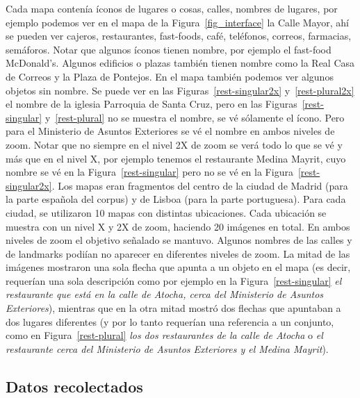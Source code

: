 Cada mapa conten\'ia \'iconos de lugares o cosas, calles, nombres de lugares, por ejemplo podemos ver en el mapa de la Figura~\ref{fig_interface} la Calle Mayor, ah\'i se pueden ver cajeros, restaurantes, fast-foods, caf\'e, tel\'efonos, correos, farmacias, sem\'aforos. Notar que algunos \'iconos tienen nombre, por ejemplo el fast-food McDonald's. Algunos edificios o plazas tambi\'en tienen nombre como la Real Casa de Correos y la Plaza de Pontejos. En el mapa tambi\'en podemos ver algunos objetos sin nombre.
Se puede ver en las Figuras~\ref{rest-singular2x} y~\ref{rest-plural2x}  el nombre de la iglesia Parroquia de Santa Cruz, pero en las Figuras~\ref{rest-singular} y~\ref{rest-plural} no se muestra el nombre, se v\'e s\'olamente el \'icono. Pero para el Ministerio de Asuntos Exteriores se v\'e el nombre en ambos niveles de zoom. Notar que no siempre en el nivel 2X de zoom se ver\'a todo lo que se v\'e y m\'as que en el nivel X, por ejemplo tenemos el restaurante Medina Mayrit, cuyo nombre se v\'e en la Figura~\ref{rest-singular} pero no se v\'e en la Figura~\ref{rest-singular2x}. 
Los mapas eran fragmentos del centro de la ciudad de Madrid (para la parte espa\~nola del corpus) y de Lisboa (para la parte portuguesa).
Para cada ciudad, se utilizaron 10 mapas con distintas ubicaciones. Cada ubicaci\'on se muestra con un nivel X y 2X de zoom, haciendo 20 im\'agenes en total. En ambos niveles de zoom el objetivo se\~{n}alado se mantuvo. Algunos nombres de las calles y de landmarks podi\'{i}an no aparecer en diferentes niveles de zoom.
La mitad de las im\'agenes mostraron una sola flecha que apunta a un objeto en el mapa (es decir, requer\'{i}an una sola descripci\'on como por ejemplo en la Figura~\ref{rest-singular} {\it el restaurante que est\'a en la calle de Atocha, cerca del Ministerio de Asuntos Exteriores}), mientras que en la otra mitad mostr\'o dos flechas que apuntaban a dos lugares diferentes (y por lo tanto requer\'ian una referencia a un conjunto, como en Figura~\ref{rest-plural} {\it los dos restaurantes de la calle de Atocha} o {\it el restaurante cerca del Ministerio de Asuntos Exteriores y el Medina Mayrit}).


\subsection{Datos recolectados}
\label{sec:datos_recolectados}


